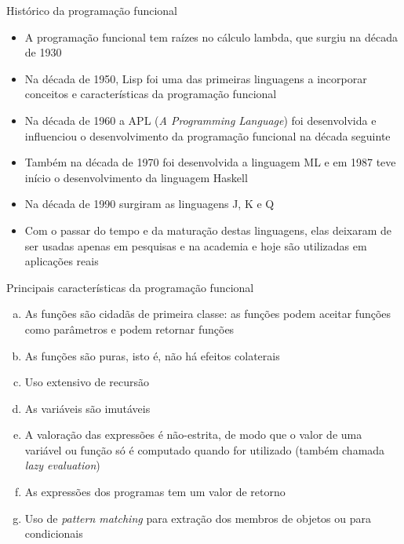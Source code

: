 \begin{frame}[fragile]{Histórico da programação funcional}

    \begin{itemize}
        \item A programação funcional tem raízes no cálculo lambda, que surgiu na década de 1930

        \item Na década de 1950, Lisp foi uma das primeiras linguagens a incorporar conceitos e
            características da programação funcional

        \item Na década de 1960 a APL (\textit{A Programming Language}) foi desenvolvida e 
            influenciou o desenvolvimento da programação funcional na década seguinte

        \item Também na década de 1970 foi desenvolvida a linguagem ML e em 1987 teve início o
            desenvolvimento da linguagem Haskell

        \item Na década de 1990 surgiram as linguagens J, K e Q

        \item Com o passar do tempo e da maturação destas linguagens, elas deixaram de ser usadas
            apenas em pesquisas e na academia e hoje são utilizadas em aplicações reais
    \end{itemize}

\end{frame}

\begin{frame}[fragile]{Principais características da programação funcional}

    \begin{enumerate}[(a)]
        \item As funções são cidadãs de primeira classe: as funções podem aceitar funções
            como parâmetros e podem retornar funções

        \item As funções são puras, isto é, não há efeitos colaterais

        \item Uso extensivo de recursão

        \item As variáveis são imutáveis

        \item A valoração das expressões é não-estrita, de modo que o valor de uma variável ou
            função só é computado quando for utilizado (também chamada \textit{lazy evaluation})

        \item As expressões dos programas tem um valor de retorno 

        \item Uso de \textit{pattern matching} para extração dos membros de objetos ou para
            condicionais
    \end{enumerate}

\end{frame}

